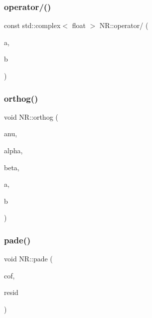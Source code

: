 \mbox{\label{namespaceNR_a56ac51a96939b7cb972bb84871a7dce4}} 
\subsubsection{\texorpdfstring{operator/()}{operator/()}\hspace{0.1cm}{\footnotesize\ttfamily [2/2]}}
{\footnotesize\ttfamily const std\+::complex$<$ float $>$ N\+R\+::operator/ (\begin{DoxyParamCaption}\item[{const std\+::complex$<$ float $>$ \&}]{a,  }\item[{const double \&}]{b }\end{DoxyParamCaption})\hspace{0.3cm}{\ttfamily [inline]}}

\mbox{\label{namespaceNR_a09eb4179b4158c839db9301f34122f40}} 
\subsubsection{\texorpdfstring{orthog()}{orthog()}}
{\footnotesize\ttfamily void N\+R\+::orthog (\begin{DoxyParamCaption}\item[{\mbox{\hyperlink{namespaceNR_a9f943da53862537c552e2a770cb170ae}{Vec\+\_\+\+I\+\_\+\+DP}} \&}]{anu,  }\item[{\mbox{\hyperlink{namespaceNR_a9f943da53862537c552e2a770cb170ae}{Vec\+\_\+\+I\+\_\+\+DP}} \&}]{alpha,  }\item[{\mbox{\hyperlink{namespaceNR_a9f943da53862537c552e2a770cb170ae}{Vec\+\_\+\+I\+\_\+\+DP}} \&}]{beta,  }\item[{\mbox{\hyperlink{namespaceNR_a970094d23441f8ef6a45282a7eb2103d}{Vec\+\_\+\+O\+\_\+\+DP}} \&}]{a,  }\item[{\mbox{\hyperlink{namespaceNR_a970094d23441f8ef6a45282a7eb2103d}{Vec\+\_\+\+O\+\_\+\+DP}} \&}]{b }\end{DoxyParamCaption})}

\mbox{\label{namespaceNR_a8e789b4a9285a750bd28cbf9d1b57654}} 
\subsubsection{\texorpdfstring{pade()}{pade()}}
{\footnotesize\ttfamily void N\+R\+::pade (\begin{DoxyParamCaption}\item[{\mbox{\hyperlink{namespaceNR_ab293e06a6bf799d8a7ed932b6852bcb8}{Vec\+\_\+\+I\+O\+\_\+\+DP}} \&}]{cof,  }\item[{\mbox{\hyperlink{namespaceNR_af6ff762dd605ff477b8e52387253a02a}{DP}} \&}]{resid }\end{DoxyParamCaption})}

